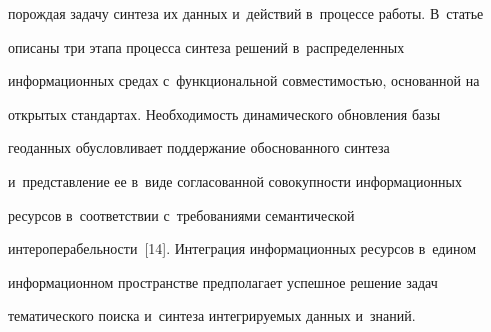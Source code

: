 порождая задачу синтеза их данных и~действий в~процессе работы. В~статье 


описаны три этапа процесса синтеза решений в~распределенных 


информационных средах с~функциональной совместимостью, основанной на 


открытых стандартах. Необходимость динамического обновления базы 


геоданных обуслов\-ли\-ва\-ет поддержание обоснованного синтеза 


и~пред\-став\-ле\-ние ее в~виде согласованной со\-во\-куп\-ности информационных 


ресурсов в~соответствии с~требованиями семантической 


интероперабельности~[14]. Интеграция информационных ресурсов в~едином 


информационном про\-странст\-ве предполагает успеш\-ное решение задач 


тематического поиска и~синтеза ин\-тег\-ри\-ру\-емых данных и~знаний.








